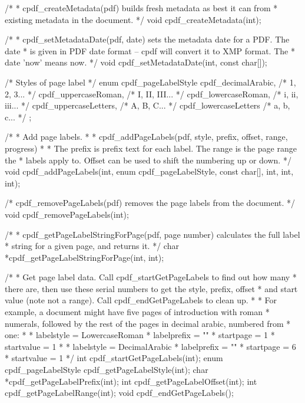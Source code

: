 /*
 * cpdf_createMetadata(pdf) builds fresh metadata as best it can from
 * existing metadata in the document.
 */
void cpdf_createMetadata(int);

/*
 * cpdf_setMetadataDate(pdf, date) sets the metadata date for a PDF. The date
 * is given in PDF date format -- cpdf will convert it to XMP format. The
 * date 'now' means now.
 */
void cpdf_setMetadataDate(int, const char[]);

/* Styles of page label */
enum cpdf_pageLabelStyle {
  cpdf_decimalArabic,    /* 1, 2, 3... */
  cpdf_uppercaseRoman,   /* I, II, III... */
  cpdf_lowercaseRoman,   /* i, ii, iii... */
  cpdf_uppercaseLetters, /* A, B, C... */
  cpdf_lowercaseLetters  /* a, b, c... */
};

/*
 * Add page labels.
 *
 * cpdf_addPageLabels(pdf, style, prefix, offset, range, progress)
 *
 * The prefix is prefix text for each label. The range is the page range the
 * labels apply to. Offset can be used to shift the numbering up or down.
 */
void cpdf_addPageLabels(int, enum cpdf_pageLabelStyle, const char[], int, int,
                        int);

/* cpdf_removePageLabels(pdf) removes the page labels from the document. */
void cpdf_removePageLabels(int);

/*
 * cpdf_getPageLabelStringForPage(pdf, page number) calculates the full label
 * string for a given page, and returns it.
 */
char *cpdf_getPageLabelStringForPage(int, int);

/*
 * Get page label data. Call cpdf_startGetPageLabels to find out how many
 * there are, then use these serial numbers to get the style, prefix, offset
 * and start value (note not a range). Call cpdf_endGetPageLabels to clean up.
 *
 * For example, a document might have five pages of introduction with roman
 * numerals, followed by the rest of the pages in decimal arabic, numbered from
 * one:
 *
 * labelstyle = LowercaseRoman
 * labelprefix = ""
 * startpage = 1
 * startvalue = 1
 *
 * labelstyle = DecimalArabic
 * labelprefix = ""
 * startpage = 6
 * startvalue = 1
 */
int cpdf_startGetPageLabels(int);
enum cpdf_pageLabelStyle cpdf_getPageLabelStyle(int);
char *cpdf_getPageLabelPrefix(int);
int cpdf_getPageLabelOffset(int);
int cpdf_getPageLabelRange(int);
void cpdf_endGetPageLabels();

